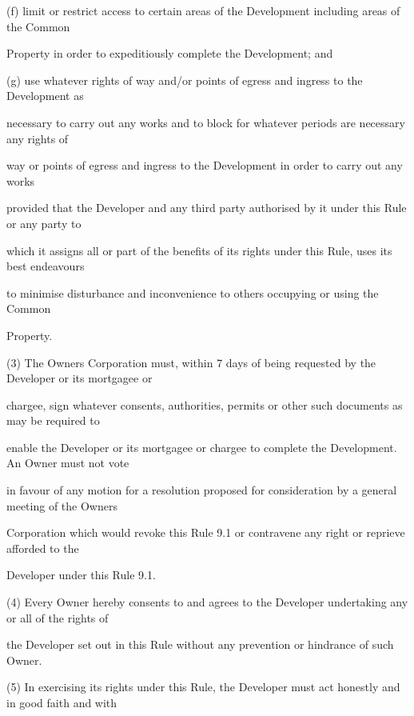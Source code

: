 \documentclass{article}
\begin{document}
{\fontsize{9.962}{1}(f) limit or restrict access to certain areas of the Development including areas of the Common }

{\fontsize{10.02}{1}Property in order to expeditiously complete the Development; and }

{\fontsize{9.962}{1}(g) use whatever rights of way and/or points of egress and ingress to the Development as }

{\fontsize{10.02}{1}necessary to carry out any works and to block for whatever periods are necessary any rights of }

{\fontsize{10.02}{1}way or points of egress and ingress to the Development in order to carry out any works }

{\fontsize{10.02}{1}provided that the Developer and any third party authorised by it under this Rule or any party to }

{\fontsize{10.02}{1}which it assigns all or part of the benefits of its rights under this Rule, uses its best endeavours }

{\fontsize{10.02}{1}to minimise disturbance and inconvenience to others occupying or using the Common }

{\fontsize{10.02}{1}Property. }

{\fontsize{9.962}{1}(3) The Owners Corporation must, within 7 days of being requested by the Developer or its mortgagee or }

{\fontsize{10.02}{1}chargee, sign whatever consents, authorities, permits or other such documents as may be required to }

{\fontsize{10.02}{1}enable the Developer or its mortgagee or chargee to complete the Development. An Owner must not vote }

{\fontsize{10.02}{1}in favour of any motion for a resolution proposed for consideration by a general meeting of the Owners }

{\fontsize{10.02}{1}Corporation which would revoke this Rule 9.1 or contravene any right or reprieve afforded to the }

{\fontsize{10.02}{1}Developer under this Rule 9.1. }

{\fontsize{9.962}{1}(4) Every Owner hereby consents to and agrees to the Developer undertaking any or all of the rights of }

{\fontsize{10.02}{1}the Developer set out in this Rule without any prevention or hindrance of such Owner. }

{\fontsize{9.962}{1}(5) In exercising its rights under this Rule, the Developer must act honestly and in good faith and with }
\end{document}
